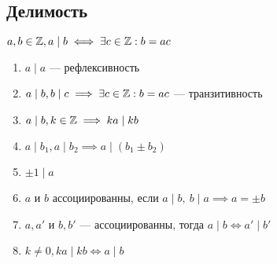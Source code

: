 \begin{normalsize}
\section {Делимость}
\begin{defn}
    $a, b \in \mathbb{Z}, a \mid b \iff \exists c \in \mathbb{Z}: b = ac$
\end{defn}

\begin{prop}
    \begin{enumerate}
        \item $a \mid a$ --- рефлексивность
        \item $a \mid b, b \mid c \implies \exists c \in \mathbb{Z}: b = ac$ --- транзитивность
        \item $a \mid b, k \in \mathbb{Z} \implies ka \mid kb$ 
        \item $a \mid b_1, a \mid b_2 \implies a \mid (b_1 \pm b_2)$
        \item $\pm1 \mid a$
        \item $a$ и $b$ ассоциированны, если $a \mid b,~b \mid a \implies a = \pm b$
        \item $a, a'$ и $b, b'$ --- ассоциированны, тогда $a \mid b \iff a' \mid b'$
        \item $k \neq 0, ka \mid kb \iff a \mid b$
    \end{enumerate}
\end{prop}

\end{normalsize}